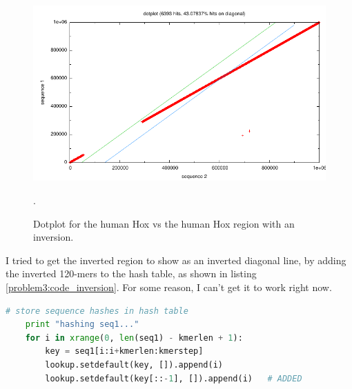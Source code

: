 \begin{figure}[htb]
  \includegraphics[width=6.8in]{6.878/ps1/figs/p3_inversion.pdf}
  \caption{Dotplot for the human Hox vs the human Hox region with an inversion.}
  \label{problem3:inversion}.
\end{figure}

I tried to get the inverted region to show as an inverted diagonal line, by
adding the inverted 120-mers to the hash table, as shown in listing
\ref{problem3:code_inversion}. For some reason, I can't get it to work right
now.

\begin{lstlisting}[language=Python, caption=Further changes to {\tt main} in
{\tt ps1-dotplot.py} for inversion detection, label=problem3:code_inversion]
    # store sequence hashes in hash table
    print "hashing seq1..."
    for i in xrange(0, len(seq1) - kmerlen + 1):
        key = seq1[i:i+kmerlen:kmerstep]
        lookup.setdefault(key, []).append(i)
        lookup.setdefault(key[::-1], []).append(i)   # ADDED
\end{lstlisting}

